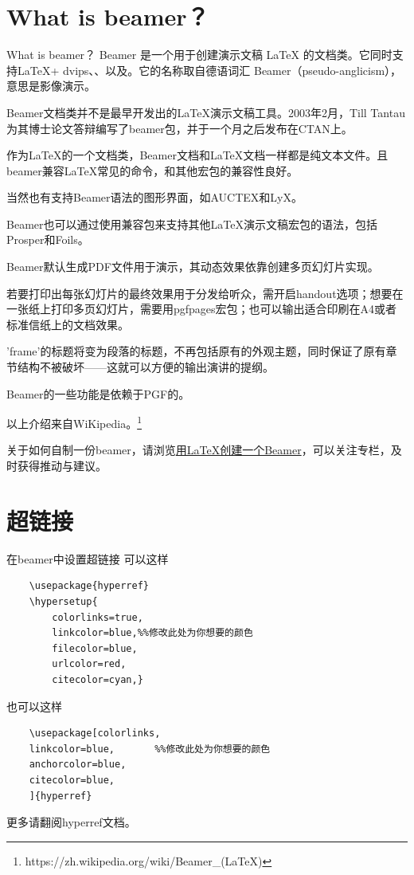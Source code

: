\documentclass[8pt,UTF8]{ctexbeamer}
\begin{document}
\section{What is beamer？}
\begin{frame}[allowframebreaks]{What is beamer？}
	Beamer 是一个用于创建演示文稿 LaTeX 的文档类。它同时支持\LaTeX + dvips、、以及。它的名称取自德语词汇 Beamer（pseudo-anglicism），意思是影像演示。
	
	Beamer文档类并不是最早开发出的\LaTeX 演示文稿工具。2003年2月，Till Tantau为其博士论文答辩编写了beamer包，并于一个月之后发布在CTAN上。
	
	作为LaTeX的一个文档类，Beamer文档和\LaTeX 文档一样都是纯文本文件。且beamer兼容\LaTeX 常见的命令，和其他宏包的兼容性良好。
	
	当然也有支持Beamer语法的图形界面，如AUCTEX和LyX。
	
	Beamer也可以通过使用兼容包来支持其他LaTeX演示文稿宏包的语法，包括 Prosper和Foils。
	
	Beamer默认生成PDF文件用于演示，其动态效果依靠创建多页幻灯片实现。
	
	若要打印出每张幻灯片的最终效果用于分发给听众，需开启handout选项；想要在一张纸上打印多页幻灯片，需要用pgfpages宏包；也可以输出适合印刷在A4或者标准信纸上的文档效果。
	
	'frame'的标题将变为段落的标题，不再包括原有的外观主题，同时保证了原有章节结构不被破坏——这就可以方便的输出演讲的提纲。
	
	Beamer的一些功能是依赖于PGF的。
	
	以上介绍来自WiKipedia。\footnote{https://zh.wikipedia.org/wiki/Beamer\_(LaTeX)}
	
	关于如何自制一份beamer，请浏览\href{https://zhuanlan.zhihu.com/p/423443762}{用LaTeX创建一个Beamer}，可以关注专栏，及时获得推动与建议。
\end{frame}

\section{超链接}
\begin{frame}[fragile]{在beamer中设置超链接}
	可以这样
\begin{verbatim}
	\usepackage{hyperref}
	\hypersetup{
		colorlinks=true,
		linkcolor=blue,%%修改此处为你想要的颜色
		filecolor=blue,      
		urlcolor=red,
		citecolor=cyan,}
\end{verbatim}
也可以这样
\begin{verbatim}
	\usepackage[colorlinks,
	linkcolor=blue,       %%修改此处为你想要的颜色
	anchorcolor=blue,  
	citecolor=blue,       
	]{hyperref}
\end{verbatim}
更多请翻阅hyperref文档。
\end{frame}
\end{document}
